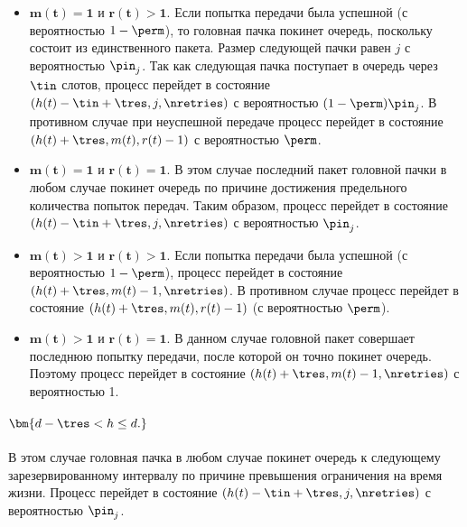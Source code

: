 \begin{itemize}
\item $\bm{m(t) = 1}$ и $\bm{r(t) > 1.}$ Если попытка передачи была успешной (с вероятностью $1-\perm$), то головная пачка покинет очередь, поскольку состоит из единственного пакета. Размер следующей пачки равен $j$ с вероятностью $\pin_j$. Так как следующая пачка поступает в очередь через $\tin$ слотов, процесс перейдет в состояние $(h(t) - \tin + \tres, j, \nretries)$ с вероятностью $(1-\perm)\pin_j$. В противном случае при неуспешной передаче процесс перейдет в состояние $(h(t) + \tres, m(t), r(t) - 1)$ с вероятностью $\perm$.
\item $\bm{m(t) = 1}$ и $\bm{r(t) = 1}$. В этом случае последний пакет головной пачки в любом случае покинет очередь по причине достижения предельного количества попыток передач. Таким образом, процесс перейдет в состояние $(h(t) - \tin + \tres, j, \nretries)$ с вероятностью $\pin_j$.
\item $\bm{m(t) > 1}$ и $\bm{r(t) > 1}$. Если попытка передачи была успешной (с вероятностью $1-\perm$), процесс перейдет в состояние $(h(t)+\tres, m(t)-1, \nretries)$. В противном случае процесс перейдет в состояние $(h(t)+\tres, m(t), r(t) - 1)$ (с вероятностью $\perm$). 
\item $\bm{m(t) > 1}$ и $\bm{r(t) = 1}$. В данном случае головной пакет совершает последнюю попытку передачи, после которой он точно покинет очередь. Поэтому процесс перейдет в состояние $(h(t)+\tres,m(t)-1,\nretries)$ с вероятностью 1.
\end{itemize}

\noindent\paragraph{$\bm{d - \tres < h \leq d.}$} В этом случае головная пачка в любом случае покинет очередь к следующему зарезервированному интервалу по причине превышения ограничения на время жизни. 
Процесс перейдет в состояние $(h(t) - \tin + \tres, j, \nretries)$ с вероятностью $\pin_j$.  

